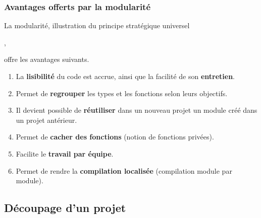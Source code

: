 \begin{frame}[fragile]
\frametitle{Avantages offerts par la modularité}
La modularité, illustration du principe stratégique universel
\begin{center}
     \fg,
\end{center}
offre les avantages suivants.
\medskip

\begin{enumerate}
    \item La {\bf lisibilité} du code est accrue, ainsi que la facilité
    de son {\bf entretien}.
    \medskip

    \item Permet de {\bf regrouper} les types et les fonctions selon leurs
    objectifs.
    \medskip

    \item Il devient possible de {\bf réutiliser} dans un nouveau projet
    un module créé dans un projet antérieur.
    \medskip

    \item Permet de {\bf cacher des fonctions} (notion de fonctions privées).
    \medskip

    \item Facilite le {\bf travail par équipe}.
    \medskip

    \item Permet de rendre la {\bf compilation localisée}
    (compilation module par module).
\end{enumerate}
\end{frame}

\subsection{Découpage d'un projet}

